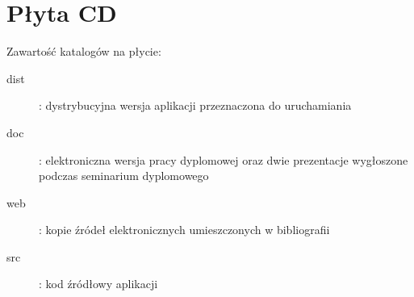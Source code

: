 \chapter{Płyta CD}\label{app:plyta}

\begin{figure}[htb]
\makebox[\textwidth]{\framebox[12.8cm]{\rule{0pt}{12.8cm}}}
\end{figure}
\pagebreak

Zawartość katalogów na płycie:
\begin{description}
  \item[dist] : dystrybucyjna wersja aplikacji przeznaczona do uruchamiania
  \item[doc] : elektroniczna wersja pracy dyplomowej oraz dwie prezentacje wygłoszone podczas seminarium dyplomowego
  \item[web] : kopie źródeł elektronicznych umieszczonych w bibliografii
  \item[src] : kod źródłowy aplikacji 
\end{description}

